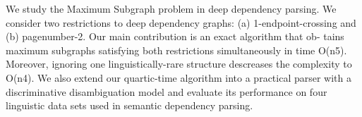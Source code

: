 We study the Maximum Subgraph problem in deep dependency parsing. We consider two restrictions to deep dependency graphs: (a) 1-endpoint-crossing and (b) pagenumber-2. Our main contribution is an exact algorithm that ob- tains maximum subgraphs satisfying both restrictions simultaneously in time O(n5). Moreover, ignoring one linguistically-rare structure descreases the complexity to O(n4). We also extend our quartic-time algorithm into a practical parser with a discriminative disambiguation model and evaluate its performance on four linguistic data sets used in semantic dependency parsing.
